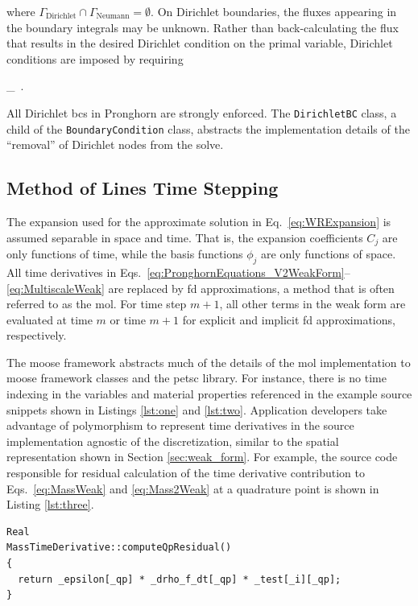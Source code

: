 \noindent where \(\Gamma_\text{Dirichlet}\cap\Gamma_\text{Neumann}=\emptyset\). On Dirichlet boundaries, the fluxes appearing in the boundary integrals may be unknown. Rather than back-calculating the flux that results in the desired Dirichlet condition on the primal variable, Dirichlet conditions are imposed by requiring

\beq
{}\Gamma\in\Gamma_\ .
\eeq

\noindent All Dirichlet \glspl{bc} in Pronghorn are strongly enforced. The \texttt{DirichletBC} class, a child of the \texttt{BoundaryCondition} class, abstracts the implementation details of the ``removal'' of Dirichlet nodes from the solve.

\subsection{Method of Lines Time Stepping}
\label{sec:mol}

The expansion used for the approximate solution in Eq.\ \eqref{eq:WRExpansion} is assumed separable in space and time. That is, the expansion coefficients \(C_j\) are only functions of time, while the basis functions \(\phi_j\) are only functions of space. All time derivatives in Eqs.\ \eqref{eq:PronghornEquations_V2WeakForm}--\eqref{eq:MultiscaleWeak} are replaced by \gls{fd} approximations, a method that is often referred to as the \gls{mol}. For time step \(m+1\), all other terms in the weak form are evaluated at time \(m\) or time \(m+1\) for explicit and implicit \gls{fd} approximations, respectively.

The \gls{moose} framework abstracts much of the details of the \gls{mol} implementation to \gls{moose} framework classes and the \gls{petsc} library. For instance, there is no time indexing in the variables and material properties referenced in the example source snippets shown in Listings \ref{lst:one} and \ref{lst:two}. Application developers take advantage of polymorphism to represent time derivatives in the source implementation agnostic of the discretization, similar to the spatial representation shown in Section \ref{sec:weak_form}. For example, the source code responsible for residual calculation of the time derivative contribution to Eqs.\ \eqref{eq:MassWeak} and \eqref{eq:Mass2Weak} at a quadrature point is shown in Listing \ref{lst:three}.

\vspace{1em}
\begin{minipage}[c]{0.92\linewidth}
\begin{lstlisting}[caption={Pronghorn source code calculation of \(\int_\Omega\epsilon\frac{\partial\rho_f}{\partial t}\psi d\Omega\).},captionpos=b,label={lst:three}]
Real
MassTimeDerivative::computeQpResidual()
{
  return _epsilon[_qp] * _drho_f_dt[_qp] * _test[_i][_qp];
}
\end{lstlisting}
\end{minipage}

